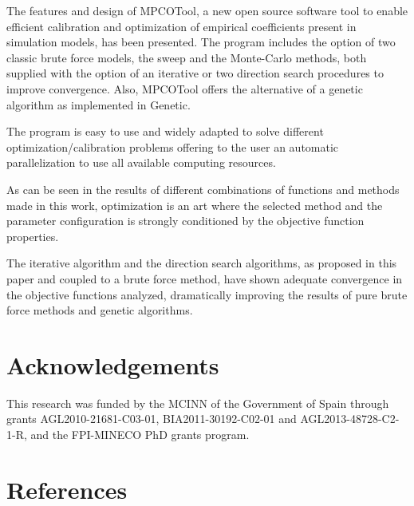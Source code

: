 \documentclass[review,authoryear]{elsarticle}
\begin{document}
The features and design of MPCOTool, a new open source software tool to enable efficient calibration and optimization of empirical coefficients present in simulation models, has been presented. The program includes the option of two classic brute force models, the sweep and the Monte-Carlo methods, both supplied with the option of an iterative or two direction search procedures to improve convergence. Also, MPCOTool offers the alternative of a genetic algorithm as implemented in Genetic.

The program is easy to use and widely adapted to solve  different optimization/calibration problems offering to the user an automatic parallelization to use all available computing resources.

As can be seen in the results of different combinations of functions and methods made in this work, optimization is an art where the selected method and the parameter configuration is strongly conditioned by the objective function properties.

The iterative algorithm and the direction search algorithms, as proposed in this paper and coupled to a brute force method, have shown adequate convergence in the objective functions analyzed, dramatically improving the results of pure brute force methods and genetic algorithms.

\section*{Acknowledgements}

This research was funded by the MCINN of the Government of
Spain through grants AGL2010-21681-C03-01, BIA2011-30192-C02-01 and
AGL2013-48728-C2-1-R, and the FPI-MINECO PhD grants program.

\section*{References}

\end{document}
